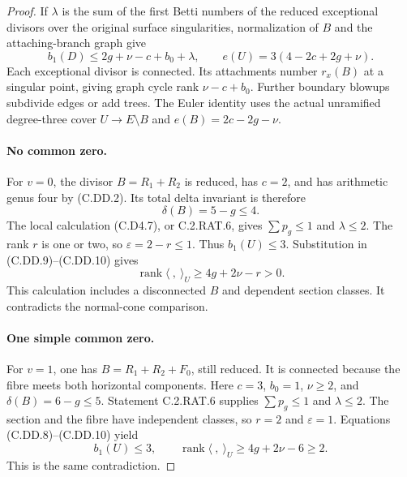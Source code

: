 \begin{proof}
If $\lambda$ is the sum of the first Betti numbers
of the reduced exceptional divisors over the original
surface singularities, normalization of $B$ and the
attaching-branch graph give
\[
 b_1(D)\le2g+\nu-c+b_0+\lambda,
 \qquad e(U)=3(4-2c+2g+\nu).
\tag{C.DD.10}
\]
Each exceptional divisor is connected. Its attachments
number $r_x(B)$ at a singular point, giving graph
cycle rank $\nu-c+b_0$. Further boundary blowups
subdivide edges or add trees. The Euler identity
uses the actual unramified degree-three cover
$U\to E\setminus B$ and
$e(B)=2c-2g-\nu$.

\paragraph{No common zero.}
For $v=0$, the divisor $B=R_1+R_2$ is reduced,
has $c=2$, and has arithmetic genus four by
(C.DD.2). Its total delta invariant is therefore
\[
                         \delta(B)=5-g\le4.
\tag{C.DD.11}
\]
The local calculation (C.D4.7), or C.2.RAT.6,
gives $\sum p_g\le1$ and $\lambda\le2$.
The rank $r$ is one or two, so
$\varepsilon=2-r\le1$. Thus $b_1(U)\le3$.
Substitution in (C.DD.9)--(C.DD.10) gives
\[
                  \operatorname{rank}\langle\ ,\ \rangle_U
                        \ge4g+2\nu-r>0.
\tag{C.DD.12}
\]
This calculation includes a disconnected $B$ and
dependent section classes. It contradicts the
normal-cone comparison.

\paragraph{One simple common zero.}
For $v=1$, one has $B=R_1+R_2+F_0$, still reduced.
It is connected because the fibre meets both
horizontal components. Here $c=3$, $b_0=1$,
$\nu\ge2$, and
$\delta(B)=6-g\le5$.
Statement C.2.RAT.6 supplies
$\sum p_g\le1$ and $\lambda\le2$.
The section and the fibre have independent classes,
so $r=2$ and $\varepsilon=1$.
Equations (C.DD.8)--(C.DD.10) yield
\[
 b_1(U)\le3,\qquad
 \operatorname{rank}\langle\ ,\ \rangle_U
                         \ge4g+2\nu-6\ge2.
\tag{C.DD.13}
\]
This is the same contradiction.


\end{proof}
